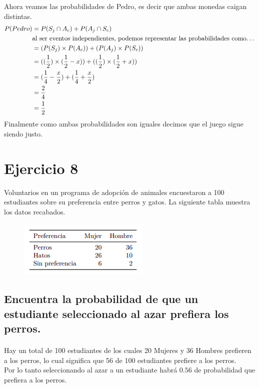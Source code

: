 \documentclass[12pt]{article}
\begin{document}
Ahora veamos las probabilidades de Pedro, es decir que ambas monedas caigan distintas.\\
\begin{equation}
\begin{split}
	P(Pedro) &= P(S_j\cap A_c) + P(A_j\cap S_c)\\
	&\text{al ser eventos independientes, podemos representar las probabilidades como\dots}\\
	&= (P(S_j) \times P(A_c)) + (P(A_j) \times P(S_c))\\
	&= ((\frac{1}{2}) \times (\frac{1}{2} - x)) + ((\frac{1}{2}) \times (\frac{1}{2} + x))\\
	&= (\frac{1}{4} - \frac{x}{2}) + (\frac{1}{4} + \frac{x}{2})\\
	&= \frac{2}{4}\\
	&= \frac{1}{2}\\
\end{split}
\end{equation}
Finalmente como ambas probabilidades son iguales decimos que el juego sigue siendo justo.
\section{Ejercicio 8} 
 Voluntarios en un programa de adopción de animales encuestaron a 100 estudiantes sobre su
preferencia entre perros y gatos. La siguiente tabla muestra los datos recabados.\\
\begin{figure}[h]
	\begin{center}
		\includegraphics[scale=0.85]{table}
	\end{center}
\end{figure}
\subsection{Encuentra la probabilidad de que un estudiante seleccionado al azar prefiera los perros.}
\paragraph{} Hay un total de 100 estudiantes de los cuales 20 Mujeres y 36 Hombres prefieren a los perros, lo cual significa que 56 de 100 estudiantes prefiere a los perros.\\
Por lo tanto seleccionando al azar a un estudiante habrá $0.56$ de probabilidad que prefiera a los perros. 
\end{document}
